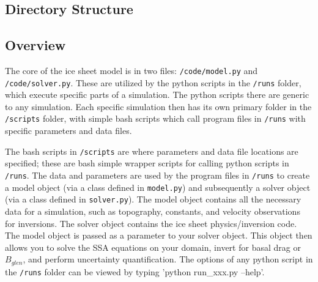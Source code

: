 \documentclass[11pt, reqno, nocenter]{article}
\begin{document}
\subsection{Directory Structure}


\subsection{Overview}

The core of the ice sheet model is in two files: {\tt /code/model.py} and {\tt /code/solver.py}. These are utilized by the python scripts in the {\tt /runs} folder, which execute specific parts of a simulation. The python scripts there are generic to any simulation. Each specific simulation then has its own primary folder in the {\tt /scripts} folder, with simple bash scripts which call program files in {\tt /runs} with specific parameters and data files.

The bash scripts in {\tt /scripts} are where parameters and data file locations are specified; these are bash simple wrapper scripts for calling python scripts in {\tt /runs}. The data and parameters are used by the program files in {\tt /runs} to create a model object (via a class defined in {\tt model.py}) and subsequently a solver object (via a class defined in {\tt solver.py}). The model object contains all the necessary data for a simulation, such as topography, constants, and velocity observations for inversions. The solver object contains the ice sheet physics/inversion code. The model object is passed as a parameter to your solver object. This object then allows you to solve the SSA equations on your domain, invert for basal drag or $B_{glen}$, and perform uncertainty quantification. The options of any python script in the {\tt /runs} folder can be viewed by typing 'python run\_xxx.py --help'.
\end{document}
